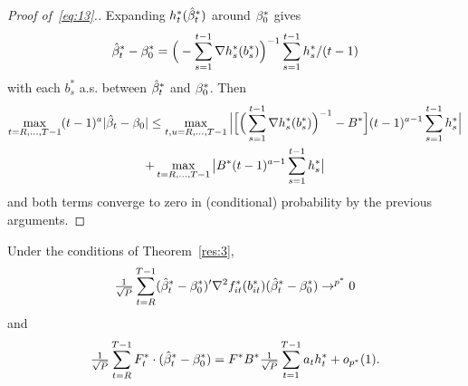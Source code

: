 \documentclass[12pt,fleqn]{article}
\begin{document}
\begin{proof}[Proof of~\eqref{eq:13}.]
Expanding $h_t^*(\hat \beta_t^*)$ around $\beta_0^*$ gives
\begin{equation*}
\hat \beta_t^* - \beta_0^* = \Big(- \sum_{s=1}^{t-1} \nabla h_s^*(b_s^*) \Big)^{-1} \sum_{s=1}^{t-1} h_s^* / (t-1)
\end{equation*}
with each $b_s^*$ a.s. between $\hat \beta_t^*$ and $\beta_0^*$. Then
\begin{multline}
  \max_{t=R,\dots,T-1} (t-1)^a | \hat{\beta}_t - \beta_0 |
  \leq
  \max_{t,u=R,\dots,T-1} \Big|\Big[ \Big(\sum_{s=1}^{t-1} \nabla h_s^*(b_s^*) \Big)^{-1} - B^* \Big]
  (t-1)^{a-1} \sum_{s=1}^{t-1} h_s^* \Big|\\
  + \max_{t=R,\dots,T-1} \big| B^*   (t-1)^{a-1} \sum_{s=1}^{t-1} h_s^* \big|
\end{multline}
and both terms converge to zero in (conditional) probability by the
previous arguments.
\end{proof}

\begin{lema}\label{res:a4}
  Under the conditions of Theorem~\ref{res:3},
  \begin{equation}\label{eq:16}
    \tfrac{1}{\sqrt{P}} \sum_{t=R}^{T-1} (\hat \beta_t^* - \beta_0^*)' \nabla^2 f_{it}^*(b_{it}^*) (\hat \beta_t^* - \beta_0^*) \to^{p^*} 0
  \end{equation}
  and
  \begin{equation}\label{eq:17}
    \tfrac{1}{\sqrt{P}} \sum_{t=R}^{T-1} F_t^* \cdot (\hat \beta_t^* - \beta_0^*)
    = F^* B^* \tfrac{1}{\sqrt{P}} \sum_{t=1}^{T-1} a_t h_t^* + o_{p^*}(1).
  \end{equation}
\end{lema}
\end{document}
